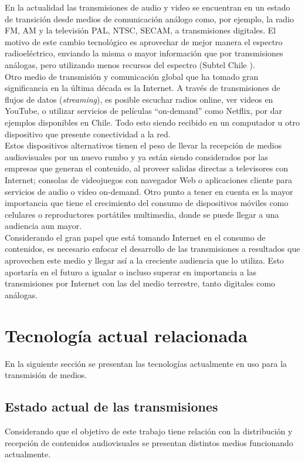 En la actualidad las transmisiones de audio y video se encuentran en un estado de transición desde medios de comunicación análogo como, por ejemplo, la radio FM, AM y la televisión PAL, NTSC, SECAM, a transmisiones digitales. El motivo de este cambio tecnológico es aprovechar de mejor manera el espectro radioeléctrico, enviando la misma o mayor información que por transmisiones análogas, pero utilizando menos recursos del espectro (Subtel Chile \cite{sota:subtel}).\\

Otro medio de transmisión y comunicación global que ha tomado gran significancia en la última década es la Internet. A través de transmisiones de flujos de datos (\textit{streaming}), es posible escuchar radios online, ver videos en YouTube, o utilizar servicios de películas “on-demand” como Netflix, por dar ejemplos disponibles en Chile. Todo esto siendo recibido en un computador u otro dispositivo que presente conectividad a la red.\\

Estos dispositivos alternativos tienen el peso de llevar la recepción de medios audiovisuales por un nuevo rumbo y ya están siendo considerados por las empresas que generan el contenido, al proveer salidas directas a televisores con Internet; consolas de videojuegos con navegador Web o aplicaciones cliente para servicios de audio o video on-demand. Otro punto a tener en cuenta es la mayor importancia que tiene el crecimiento del consumo de dispositivos móviles como celulares o reproductores portátiles multimedia, donde se puede llegar a una audiencia aun mayor.\\

Considerando el gran papel que está tomando Internet en el consumo de contenidos, es necesario enfocar el desarrollo de las transmisiones a resultados que aprovechen este medio y llegar así a la creciente audiencia que lo utiliza. 
Esto aportaría en el futuro a igualar o incluso superar en importancia a las transmisiones por Internet con las del medio terrestre, tanto digitales como análogas.

\section{Tecnología actual relacionada}
En la siguiente sección se presentan las tecnologías actualmente en uso para la transmisión de medios.

\subsection{Estado actual de las transmisiones}
Considerando que el objetivo de este trabajo tiene relación con la distribución y recepción de contenidos audiovisuales se presentan distintos medios funcionando actualmente.\\

